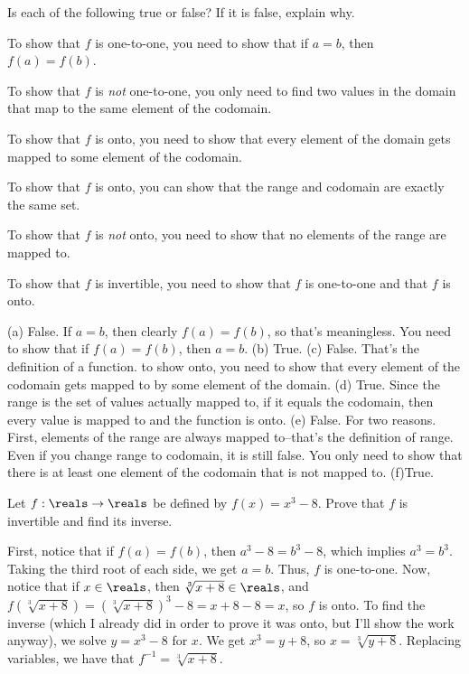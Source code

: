 \begin{requ}
Is each of the following true or false? If it is false, explain why.
\begin{lenum}
\item To show that $f$ is one-to-one, you need to show that if $a=b$, then $f(a)=f(b)$.
\item To show that $f$ is {\em not} one-to-one, you only need to find two values in the domain that map
to the same element of the codomain.
\item To show that $f$ is onto, you need to show that every element of the domain gets mapped to some element
of the codomain.
\item To show that $f$ is onto, you can show that the range and codomain are exactly the same set.
\item To show that $f$ is {\em not} onto, you need to show that no elements of the range are mapped to.
\item To show that $f$ is invertible, you need to show that $f$ is one-to-one and that $f$ is onto.
\end{lenum}
\begin{requanswer}
(a) False. If $a=b$, then clearly $f(a)=f(b)$, so that's meaningless. You need to show that if $f(a)=f(b)$, then $a=b$. 
(b) True.
(c) False. That's the definition of a function. to show onto, you need to show that every element of the codomain 
gets mapped to by some element of the domain.
(d) True. Since the range is the set of values actually mapped to, if it equals the codomain, then every value is mapped
to and the function is onto.
(e) False. For two reasons. First, elements of the range are always mapped to--that's the definition of range.
Even if you change range to codomain, it is still false. You only need to show that there is at least one element of the
codomain that is not mapped to.
(f)True.
\end{requanswer}
\end{requ}


\begin{requ}
Let $f:\reals\rightarrow\reals$ be defined by
$f(x)=x^3-8$. Prove that $f$ is invertible and find its inverse.
\begin{requanswer}
First, notice that if $f(a)=f(b)$, then $a^3-8=b^3-8$,
which implies $a^3=b^3$. Taking the third root of each side,
we get $a=b$. Thus, $f$ is one-to-one.
Now, notice that if $x\in\reals$, then $\sqrt[3]{x+8}\in \reals$,
and $f\left(\sqrt[3]{x+8}\right)=\left(\sqrt[3]{x+8}\right)^3-8=x+8-8=x$,
so $f$ is onto.
To find the inverse (which I already did in order to prove it was
onto, but I'll show the work anyway), 
we solve $y=x^3-8$ for $x$. We get $x^3=y+8$, so
$x=\sqrt[3]{y+8}$. Replacing variables, we have
that $f^{-1}=\sqrt[3]{x+8}$.
\end{requanswer}
\end{requ}

